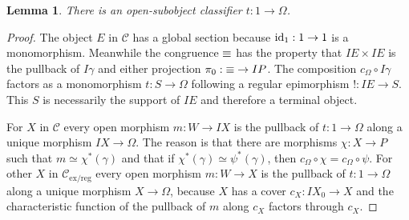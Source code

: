 \documentclass[sort&compress]{elsarticle}
\theoremstyle{plain}
\newtheorem{lemma}[theorem]{Lemma}
\theoremstyle{definition}
\theoremstyle{remark}
\newcommand\hide[1]{}
\newcommand\cat\mathcal
\newcommand\exlex{_\mathrm{ex/lex}}\newcommand\exreg{_\mathrm{ex/reg}}
\begin{document}
\hide{
\begin{lemma} There is a natural isomorphism $\cat C\exlex (I-,\Omega) \to \cl(I-)$.\label{iso1} \end{lemma}

\begin{proof} The relation $\exeq$ is defined in such a way, that $c_\Omega\circ If = c_\Omega\circ Ig$ if and only if $f\inv(\db{I \gamma}) = g\inv(\db{I \gamma})$ for each pair $f,g:X\to P$. Meanwhile, $I:\sub(X) \to \cl(IX)$ is an isomorphism by lemma \ref{charclosed}. 
The map $\cat C\exlex (IX,\Omega) \to \cl(IX)$ takes a morphism $f:IX\to \Omega$, factors it as $c_\Omega\circ If_0$ and then pulls $I\gamma$ back along $If_0$. This is a well defined and injective map, because every factorization of $f$ through $c_\Omega$ gives the same open subobject of $IX$. It is surjective because $\gamma$ is a generic monomorphism.

If $g:X\to Y$, then $\cl(Ig):\cl(IY) \to \cl(IX)$ commutes with $\cat C\exlex(Ig,\Omega)$ because if $h = c_\Omega\circ Ih_0:Y\to \Omega$ then $h\circ g = c_\Omega\circ Ih_0\circ g$. 
\end{proof}
}

\begin{lemma} There is an open-subobject classifier $t:1\to \Omega$. \label{iso3} \end{lemma}

\begin{proof} The object $E$ in $\cat C$ has a global section because $\mathrm{id}_1:1\to 1$ is a monomorphism. Meanwhile the congruence $\exeq$ has the property that $IE\times IE$ is the pullback of $I\gamma$ and either projection $\pi_0:\mathord {\equiv} \to IP$. The composition $c_\Omega\circ I\gamma$ factors as a monomorphism $t:S\to \Omega$ following a regular epimorphism $!:IE\to S$. This $S$ is necessarily the support of $IE$ and therefore a terminal object.

For $X$ in $\cat C$ every open morphism $m:W\to IX$ is the pullback of $t:1\to \Omega$ along a unique morphism $IX\to \Omega$. The reason is that there are morphisms $\chi:X\to P$ such that $m \simeq \chi^*(\gamma)$ and that if $\chi^*(\gamma)\simeq \psi^*(\gamma)$, then $c_\Omega\circ \chi = c_\Omega\circ \psi$. For other $X$ in $\cat C\exreg$ every open morphism $m:W\to X$ is the pullback of $t:1\to \Omega$ along a unique morphism $X\to \Omega$, because $X$ has a cover $c_X:IX_0 \to X$ and the characteristic function of the pullback of $m$ along $c_X$ factors through $c_X$.\end{proof}
\end{document}
